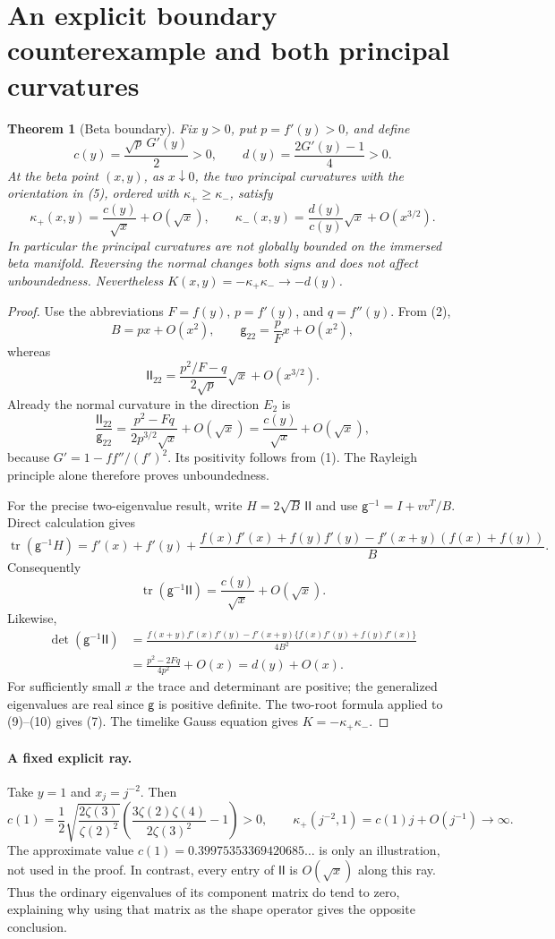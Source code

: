\documentclass[11pt,a4paper]{article}
\newtheorem{theorem}{Theorem}
\newcommand{\tr}{\operatorname{tr}}
\begin{document}
\section{An explicit boundary counterexample and both principal curvatures}
\begin{theorem}[Beta boundary]
Fix $y>0$, put $p=f'(y)>0$, and define
\[
 c(y)=\frac{\sqrt p\,G'(y)}2>0,
 \qquad d(y)=\frac{2G'(y)-1}{4}>0.
\]
At the beta point $(x,y)$, as $x\downarrow0$, the two principal
curvatures with the orientation in (5), ordered with
$\kappa_+\ge\kappa_-$, satisfy
\[
 \kappa_+(x,y)=\frac{c(y)}{\sqrt x}+O(\sqrt x),\qquad
 \kappa_-(x,y)=\frac{d(y)}{c(y)}\sqrt x+O(x^{3/2}).
\tag{7}
\]
In particular the principal curvatures are not globally bounded on the
immersed beta manifold. Reversing the normal changes both signs and
does not affect unboundedness. Nevertheless
$K(x,y)=-\kappa_+\kappa_-\to-d(y)$.
\end{theorem}
\begin{proof}
Use the abbreviations $F=f(y)$, $p=f'(y)$, and $q=f''(y)$.
From (2),
\[
 B=px+O(x^2),\qquad
 \mathsf g_{22}=\frac{p}{F}x+O(x^2),
\]
whereas
\[
 \mathsf{II}_{22}
 =\frac{p^2/F-q}{2\sqrt p}\sqrt x+O(x^{3/2}).
\]
Already the normal curvature in the direction $E_2$ is
\[
 \frac{\mathsf{II}_{22}}{\mathsf g_{22}}
 =\frac{p^2-Fq}{2p^{3/2}\sqrt x}+O(\sqrt x)
 =\frac{c(y)}{\sqrt x}+O(\sqrt x),
\tag{8}
\]
because $G'=1-ff''/(f')^2$. Its positivity follows from (1).
The Rayleigh principle alone therefore proves unboundedness.

For the precise two-eigenvalue result, write
$H=2\sqrt B\,\mathsf{II}$ and use
$\mathsf g^{-1}=I+vv^{\!T}/B$. Direct calculation gives
\[
 \tr(\mathsf g^{-1}H)
 =f'(x)+f'(y)+
 \frac{f(x)f'(x)+f(y)f'(y)-f'(x+y)(f(x)+f(y))}{B}.
\]
Consequently
\[
 \tr(\mathsf g^{-1}\mathsf{II})
 =\frac{c(y)}{\sqrt x}+O(\sqrt x).
\tag{9}
\]
Likewise,
\[
 \begin{aligned}
 \det(\mathsf g^{-1}\mathsf{II})&=
 \frac{f(x+y)f'(x)f'(y)
 -f'(x+y)\{f(x)f'(y)+f(y)f'(x)\}}{4B^2}\\
 &=\frac{p^2-2Fq}{4p^2}+O(x)
 =d(y)+O(x).
 \end{aligned}
\tag{10}
\]
For sufficiently small $x$ the trace and determinant are positive;
the generalized eigenvalues are real since $\mathsf g$ is positive
definite. The two-root formula applied to (9)--(10) gives (7).
The timelike Gauss equation gives $K=-\kappa_+\kappa_-$.
\end{proof}

\paragraph{A fixed explicit ray.}
Take $y=1$ and $x_j=j^{-2}$. Then
\[
 c(1)=\frac12\sqrt{\frac{2\zeta(3)}{\zeta(2)^2}}
 \left(\frac{3\zeta(2)\zeta(4)}{2\zeta(3)^2}-1\right)>0,
 \qquad \kappa_+(j^{-2},1)=c(1)j+O(j^{-1})\to\infty.
\]
The approximate value $c(1)=0.39975353369420685\ldots$ is only an
illustration, not used in the proof. In contrast, every entry of
$\mathsf{II}$ is $O(\sqrt x)$ along this ray. Thus the ordinary
eigenvalues of its component matrix do tend to zero, explaining why
using that matrix as the shape operator gives the opposite conclusion.
\end{document}
